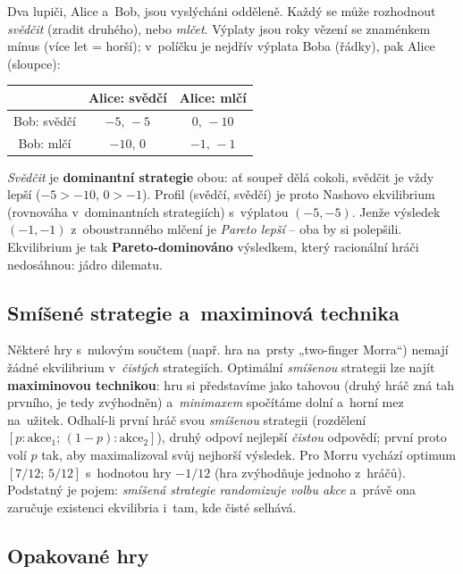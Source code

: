 \begin{priklad}
Dva lupiči, Alice a~Bob, jsou vyslýcháni odděleně. Každý se může rozhodnout \emph{svědčit} (zradit druhého), nebo \emph{mlčet}. Výplaty jsou roky vězení se znaménkem mínus (více let = horší); v~políčku je nejdřív výplata Boba (řádky), pak Alice (sloupce):
\begin{center}\small
\renewcommand{\arraystretch}{1.25}
\begin{tabular}{|c|c|c|}
\hline
 & Alice: svědčí & Alice: mlčí \\
\hline
Bob: svědčí & $-5,\,-5$ & $0,\,-10$ \\
\hline
Bob: mlčí & $-10,\,0$ & $-1,\,-1$ \\
\hline
\end{tabular}
\end{center}
\emph{Svědčit} je \textbf{dominantní strategie} obou: ať soupeř dělá cokoli, svědčit je vždy lepší ($-5>-10$, $0>-1$). Profil (svědčí, svědčí) je proto Nashovo ekvilibrium (rovnováha v~dominantních strategiích) s~výplatou $(-5,-5)$. Jenže výsledek $(-1,-1)$ z~oboustranného mlčení je \emph{Pareto lepší} -- oba by si polepšili. Ekvilibrium je tak \textbf{Pareto-dominováno} výsledkem, který racionální hráči nedosáhnou: jádro dilematu.
\end{priklad}

\subsection{Smíšené strategie a~maximinová technika}

Některé hry s~nulovým součtem (např. hra na~prsty „two-finger Morra``) nemají žádné ekvilibrium v~\emph{čistých} strategiích. Optimální \emph{smíšenou} strategii lze najít \textbf{maximinovou technikou}: hru si představíme jako tahovou (druhý hráč zná tah prvního, je tedy zvýhodněn) a~\emph{minimaxem} spočítáme dolní a~horní mez na~užitek. Odhalí-li první hráč svou \emph{smíšenou} strategii (rozdělení $[p:\text{akce}_1;\,(1-p):\text{akce}_2]$), druhý odpoví nejlepší \emph{čistou} odpovědí; první proto volí $p$ tak, aby maximalizoval svůj nejhorší výsledek. Pro Morru vychází optimum $[7/12;\,5/12]$ s~hodnotou hry $-1/12$ (hra zvýhodňuje jednoho z~hráčů). Podstatný je pojem: \emph{smíšená strategie randomizuje volbu akce} a~právě ona zaručuje existenci ekvilibria i~tam, kde čisté selhává.

\subsection{Opakované hry}

